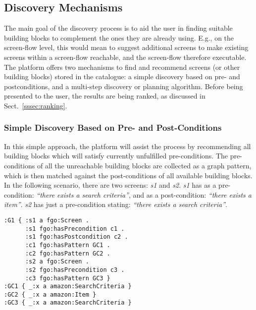 
\subsection{Discovery Mechanisms} %
\label{ssec:discovery}


The main goal of the discovery process is to aid the user in finding suitable building blocks to complement the ones they are already using. E.g., on the screen-flow level, this would mean to suggest additional screens to make existing screens within a screen-flow reachable, and the screen-flow therefore executable.
The platform offers two mechanisms to find and recommend screens (or other building blocks) stored in the catalogue: a simple discovery based on pre- and postconditions, and a multi-step discovery or planning algorithm. 
Before being presented to the user, the results are being ranked, as discussed in Sect.~\ref{sssec:ranking}. 

\subsubsection{Simple Discovery Based on Pre- and Post-Conditions}
\label{sssec:simple_discovery}

In this simple approach, the platform will assist the process by recommending all building blocks which will satisfy currently unfulfilled pre-conditions. 
The pre-conditions of all the unreachable building blocks are collected as a graph pattern, which is then matched against the post-conditions of all available building blocks. 
In the following scenario, there are two 
screens: \emph{s1} and \emph{s2}. \emph{s1} has as a pre-condition: \emph{``there exists a search criteria''}, and as a 
post-condition: \emph{``there exists a item''}. \emph{s2} has just a pre-condition stating: \emph{``there exists a search criteria''}.

\lstset{
	language=sparql
}
\begin{lstlisting}
:G1 { :s1 a fgo:Screen .      
      :s1 fgo:hasPrecondition c1 .
      :s1 fgo:hasPostcondition c2 .
      :c1 fgo:hasPattern GC1 .
      :c2 fgo:hasPattern GC2 .
      :s2 a fgo:Screen .      
      :s2 fgo:hasPrecondition c3 .
      :c3 fgo:hasPattern GC3 }
:GC1 { _:x a amazon:SearchCriteria }
:GC2 { _:x a amazon:Item }
:GC3 { _:x a amazon:SearchCriteria }
\end{lstlisting}


